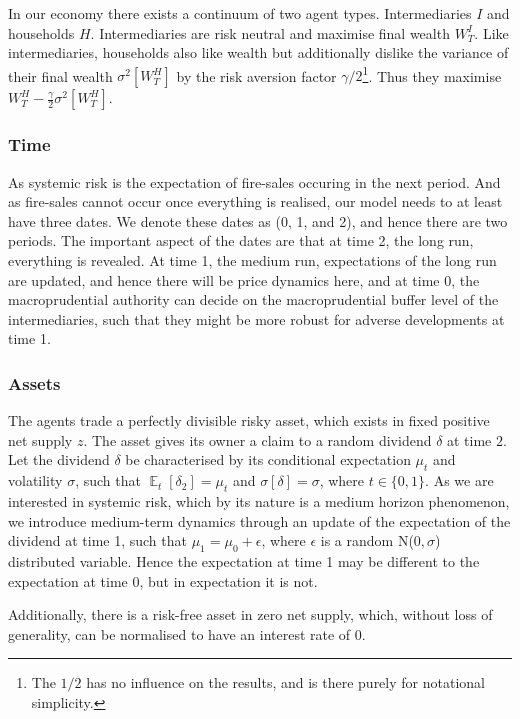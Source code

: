 \documentclass[11pt]{article}
\DeclareMathOperator{\E}{\mathbb{E}} %
\begin{document}
In our economy there exists a continuum of two agent types. Intermediaries $I$ and households $H$. Intermediaries are risk neutral and maximise final wealth $W^I_T$. Like intermediaries, households also like wealth but additionally dislike the variance of their final wealth $\sigma^2[W^H_T]$ by the risk aversion factor $\gamma/2$\footnote{The $1/2$ has no influence on the results, and is there purely for notational simplicity.}. Thus they maximise $W^H_T - \frac{\gamma}{2}\sigma^2[W^H_T]$.

\subsubsection*{Time}
As systemic risk is the expectation of fire-sales occuring in the next period. And as fire-sales cannot occur once everything is realised, our model needs to at least have three dates. We denote these dates as (0, 1, and 2), and hence there are two periods. The important aspect of the dates are that at time 2, the long run, everything is revealed. At time 1, the medium run, expectations of the long run are updated, and hence there will be price dynamics here, and at time 0, the macroprudential authority can decide on the macroprudential buffer level of the intermediaries, such that they might be more robust for adverse developments at time 1.


\subsubsection*{Assets}

The agents trade a perfectly divisible risky asset, which exists in fixed positive net supply $z$. The asset gives its owner a claim to a random dividend $\delta$ at time $2$. Let the dividend $\delta$ be characterised by its conditional expectation $\mu_t$ and volatility $\sigma$, such that $\E_t[\delta_2] = \mu_t$ and $\sigma[\delta] = \sigma$, where $t\in\{0,1\}$. As we are interested in systemic risk, which by its nature is a medium horizon phenomenon, we introduce medium-term dynamics through an update of the expectation of the dividend at time 1, such that $\mu_1 = \mu_0 + \epsilon$, where $\epsilon$ is a random N($0,\sigma$) distributed variable. Hence the expectation at time 1 may be different to the expectation at time 0, but in expectation it is not.

Additionally, there is a risk-free asset in zero net supply, which, without loss of generality, can be normalised to have an interest rate of 0.
\end{document}
